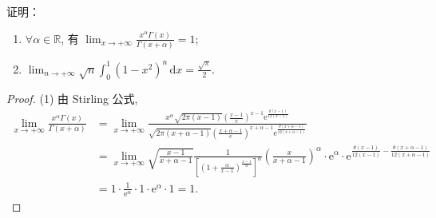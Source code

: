 \begin{example}\label{ex:15.4.5}
证明：
\begin{enumerate}
  \item $\forall\alpha\in\mathbb{R}$, 有 $\displaystyle\lim_{x\to+\infty}\frac{x^{\alpha}\Gamma(x)}{\Gamma(x+\alpha)}=1$;
  \item $\displaystyle\lim_{n\to+\infty}\sqrt{n}\int_{0}^{1}(1-x^{2})^{n}\,\mathrm{d}x=\frac{\sqrt{\pi}}{2}$.
\end{enumerate}
\end{example}
\begin{proof}
(1) 由 Stirling 公式,
\[
  \begin{aligned}
    \lim_{x\to+\infty}\frac{x^{\alpha}\Gamma(x)}{\Gamma(x+\alpha)}&=\lim_{x\to+\infty}\frac{x^{\alpha}\sqrt{2\pi(x-1)}\left(\frac{x-1}{\mathrm{e}}\right)^{x-1}\mathrm{e}^{\frac{\theta(x-1)}{12(x-1)}}}{\sqrt{2\pi(x+\alpha-1)}\left(\frac{x+\alpha-1}{\mathrm{e}}\right)^{x+\alpha-1}\mathrm{e}^{\frac{\theta(x+\alpha-1)}{12(x+\alpha-1)}}}\\
    &=\lim_{x\to+\infty}\sqrt{\frac{x-1}{x+\alpha-1}}\frac{1}{\left[\left(1+\frac{\alpha}{x-1}\right)^{\frac{x-1}{\alpha}}\right]^{\alpha}}\left(\frac{x}{x+\alpha-1}\right)^{\alpha}\cdot\mathrm{e}^{\alpha}\cdot\mathrm{e}^{\frac{\theta(x-1)}{12(x-1)}-\frac{\theta(x+\alpha-1)}{12(x+\alpha-1)}}\\
    &=1\cdot\frac{1}{\mathrm{e}^{\alpha}}\cdot 1\cdot\mathrm{e}^{\alpha}\cdot 1=1.
  \end{aligned}
\]


\end{proof}
